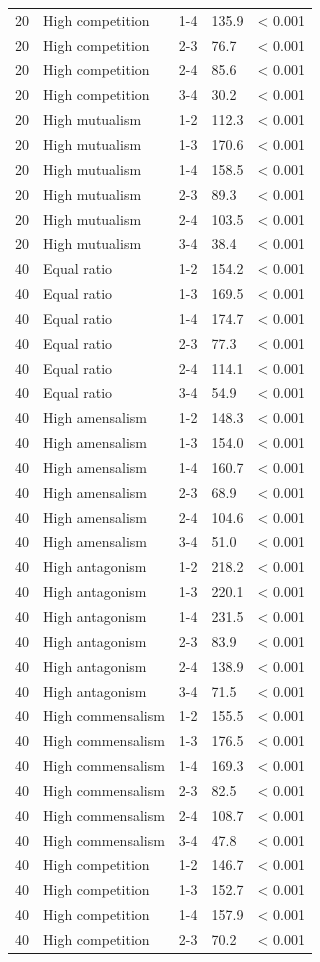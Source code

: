 \begin{longtable}[]{@{}lllll@{}}
20 & High competition & 1-4 & 135.9 & \textless{} 0.001\tabularnewline
20 & High competition & 2-3 & 76.7 & \textless{} 0.001\tabularnewline
20 & High competition & 2-4 & 85.6 & \textless{} 0.001\tabularnewline
20 & High competition & 3-4 & 30.2 & \textless{} 0.001\tabularnewline
20 & High mutualism & 1-2 & 112.3 & \textless{} 0.001\tabularnewline
20 & High mutualism & 1-3 & 170.6 & \textless{} 0.001\tabularnewline
20 & High mutualism & 1-4 & 158.5 & \textless{} 0.001\tabularnewline
20 & High mutualism & 2-3 & 89.3 & \textless{} 0.001\tabularnewline
20 & High mutualism & 2-4 & 103.5 & \textless{} 0.001\tabularnewline
20 & High mutualism & 3-4 & 38.4 & \textless{} 0.001\tabularnewline
40 & Equal ratio & 1-2 & 154.2 & \textless{} 0.001\tabularnewline
40 & Equal ratio & 1-3 & 169.5 & \textless{} 0.001\tabularnewline
40 & Equal ratio & 1-4 & 174.7 & \textless{} 0.001\tabularnewline
40 & Equal ratio & 2-3 & 77.3 & \textless{} 0.001\tabularnewline
40 & Equal ratio & 2-4 & 114.1 & \textless{} 0.001\tabularnewline
40 & Equal ratio & 3-4 & 54.9 & \textless{} 0.001\tabularnewline
40 & High amensalism & 1-2 & 148.3 & \textless{} 0.001\tabularnewline
40 & High amensalism & 1-3 & 154.0 & \textless{} 0.001\tabularnewline
40 & High amensalism & 1-4 & 160.7 & \textless{} 0.001\tabularnewline
40 & High amensalism & 2-3 & 68.9 & \textless{} 0.001\tabularnewline
40 & High amensalism & 2-4 & 104.6 & \textless{} 0.001\tabularnewline
40 & High amensalism & 3-4 & 51.0 & \textless{} 0.001\tabularnewline
40 & High antagonism & 1-2 & 218.2 & \textless{} 0.001\tabularnewline
40 & High antagonism & 1-3 & 220.1 & \textless{} 0.001\tabularnewline
40 & High antagonism & 1-4 & 231.5 & \textless{} 0.001\tabularnewline
40 & High antagonism & 2-3 & 83.9 & \textless{} 0.001\tabularnewline
40 & High antagonism & 2-4 & 138.9 & \textless{} 0.001\tabularnewline
40 & High antagonism & 3-4 & 71.5 & \textless{} 0.001\tabularnewline
40 & High commensalism & 1-2 & 155.5 & \textless{} 0.001\tabularnewline
40 & High commensalism & 1-3 & 176.5 & \textless{} 0.001\tabularnewline
40 & High commensalism & 1-4 & 169.3 & \textless{} 0.001\tabularnewline
40 & High commensalism & 2-3 & 82.5 & \textless{} 0.001\tabularnewline
40 & High commensalism & 2-4 & 108.7 & \textless{} 0.001\tabularnewline
40 & High commensalism & 3-4 & 47.8 & \textless{} 0.001\tabularnewline
40 & High competition & 1-2 & 146.7 & \textless{} 0.001\tabularnewline
40 & High competition & 1-3 & 152.7 & \textless{} 0.001\tabularnewline
40 & High competition & 1-4 & 157.9 & \textless{} 0.001\tabularnewline
40 & High competition & 2-3 & 70.2 & \textless{} 0.001\tabularnewline

\end{longtable}
